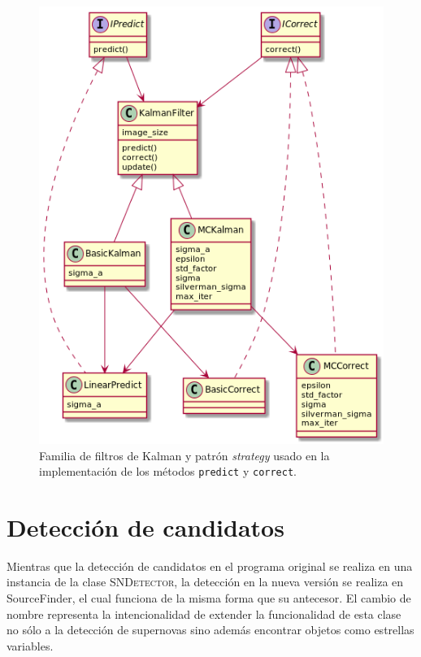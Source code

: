 \begin{figure}
\centering
\includegraphics[scale=.5]{images/kalmanfilter_class}
\caption{Familia de filtros de Kalman y patr\'on \textit{strategy} usado en la implementaci\'on de los m\'etodos \texttt{predict} y \texttt{correct}.}
\label{fig:ref1}
\end{figure}

\section{Detecci\'on de candidatos}
Mientras que la detecci\'on de candidatos en el programa original se realiza en una instancia de la clase \textsc{SNDetector}, la detecci\'on en la nueva versi\'on se realiza en SourceFinder, el cual funciona de la misma forma que su antecesor. El cambio de nombre representa la intencionalidad de extender la funcionalidad de esta clase no s\'olo a la detecci\'on de supernovas sino adem\'as encontrar objetos como estrellas variables.
\bigskip

